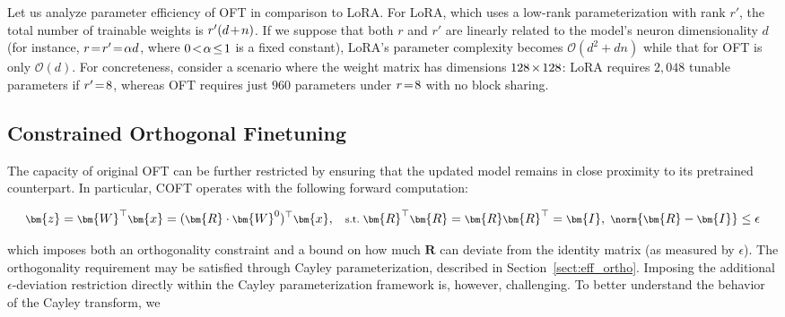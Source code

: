 Let us analyze parameter efficiency of OFT in comparison to LoRA. For LoRA, which uses a low-rank parameterization with rank $r'$, the total number of trainable weights is $\thickmuskip=2mu \medmuskip=2mu r'(d+n)$. If we suppose that both $r$ and $r'$ are linearly related to the model's neuron dimensionality $d$ (for instance, $\thickmuskip=2mu \medmuskip=2mu r=r'=\alpha d$, where $\thickmuskip=2mu \medmuskip=2mu 0 < \alpha \leq 1$ is a fixed constant), LoRA’s parameter complexity becomes $\mathcal{O}(d^2+dn)$ while that for OFT is only $\mathcal{O}(d)$. For concreteness, consider a scenario where the weight matrix has dimensions $\thickmuskip=2mu \medmuskip=2mu 128 \times 128$: LoRA requires $2,048$ tunable parameters if $\thickmuskip=2mu \medmuskip=2mu r' = 8$, whereas OFT requires just $960$ parameters under $\thickmuskip=2mu \medmuskip=2mu r = 8$ with no block sharing.

\subsection{Constrained Orthogonal Finetuning}

The capacity of original OFT can be further restricted by ensuring that the updated model remains in close proximity to its pretrained counterpart. In particular, COFT operates with the following forward computation:

\begin{equation}\label{eq:coft_general}
    \footnotesize
    \bm{z} = \bm{W}^\top \bm{x} = (\bm{R} \cdot \bm{W}^0)^\top \bm{x},~~~\text{s.t.}~\bm{R}^\top \bm{R} = \bm{R}\bm{R}^\top = \bm{I},~\norm{\bm{R} - \bm{I}} \leq \epsilon
\end{equation}

which imposes both an orthogonality constraint and a bound on how much $\bm{R}$ can deviate from the identity matrix (as measured by $\epsilon$). The orthogonality requirement may be satisfied through Cayley parameterization, described in Section~\ref{sect:eff_ortho}. Imposing the additional $\epsilon$-deviation restriction directly within the Cayley parameterization framework is, however, challenging. To better understand the behavior of the Cayley transform, we

